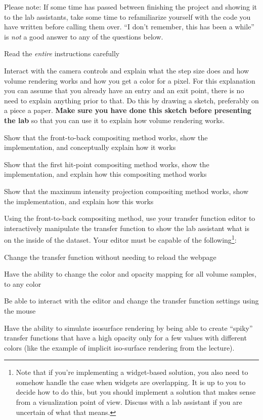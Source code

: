 \documentclass{labinstructions}
\begin{document}
Please note: If some time has passed between finishing the project and showing it to the lab assistants, take some time to refamiliarize yourself with the code you have written before calling them over.  ``I don't remember, this has been a while'' is \emph{not} a good answer to any of the questions below.
\begin{todolist}
  \item Read the \emph{entire} instructions carefully
  \item Interact with the camera controls and explain what the step size does and how volume rendering works and how you get a color for a pixel.  For this explanation you can assume that you already have an entry and an exit point, there is no need to explain anything prior to that.  Do this by drawing a sketch, preferably on a piece a paper. \textbf{Make sure you have done this sketch before presenting the lab} so that you can use it to explain how volume rendering works.
  \item Show that the front-to-back compositing method works, show the implementation, and conceptually explain how it works
  \item Show that the first hit-point compositing method works, show the implementation, and explain how this compositing method works
  \item Show that the maximum intensity projection compositing method works, show the implementation, and explain how this works
  \item Using the front-to-back compositing method, use your transfer function editor to interactively manipulate the transfer function to show the lab assistant what is on the inside of the dataset. 
Your editor must be capable of the following\footnote{Note that if you're implementing a widget-based solution, you also need to somehow handle the case when widgets are overlapping. It is up to you to decide how to do this, but you should implement a solution that makes sense from a visualization point of view. Discuss with a lab assistant if you are uncertain of what that means. }:
  \begin{todolist}
    \item Change the transfer function without needing to reload the webpage
    \item Have the ability to change the color and opacity mapping for all volume samples, to any color
    \item Be able to interact with the editor and change the transfer function settings using the mouse
    \item Have the ability to simulate isosurface rendering by being able to create ``spiky'' transfer functions that have a high opacity only for a few values with different colors (like the example of implicit iso-surface rendering from the lecture).

\end{todolist}
\end{todolist}
\end{document}
